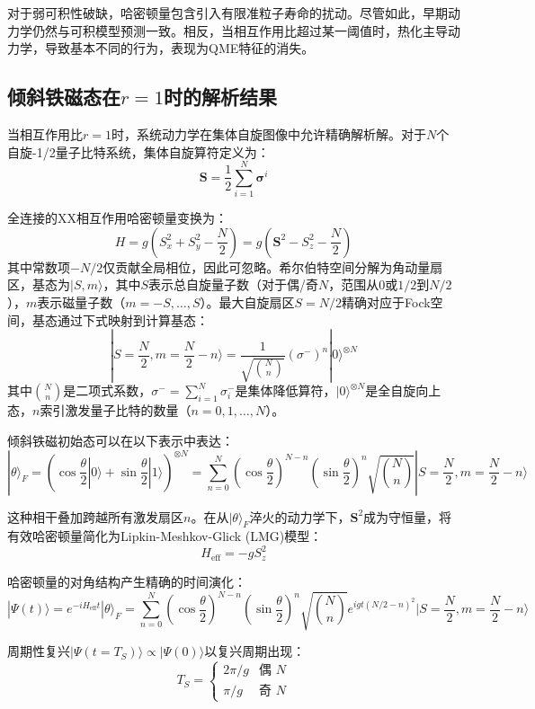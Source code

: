 \documentclass[11pt,a4paper]{article}
\begin{document}
对于弱可积性破缺，哈密顿量包含引入有限准粒子寿命的扰动。尽管如此，早期动力学仍然与可积模型预测一致。相反，当相互作用比超过某一阈值时，热化主导动力学，导致基本不同的行为，表现为QME特征的消失。

\subsection{倾斜铁磁态在$r=1$时的解析结果}

当相互作用比$r=1$时，系统动力学在集体自旋图像中允许精确解析解。对于$N$个自旋-1/2量子比特系统，集体自旋算符定义为：
\[
\bm{S} = \frac{1}{2} \sum_{i=1}^{N} \bm{\sigma}^i
\]

全连接的XX相互作用哈密顿量变换为：
\[
H = g\left(S_x^2 + S_y^2 - \frac{N}{2}\right) = g\left(\bm{S}^2 - S_z^2 - \frac{N}{2}\right)
\]
其中常数项$-N/2$仅贡献全局相位，因此可忽略。希尔伯特空间分解为角动量扇区，基态为$|S,m\rangle$，其中$S$表示总自旋量子数（对于偶/奇$N$，范围从$0$或$1/2$到$N/2$），$m$表示磁量子数（$m=-S,\ldots,S$）。最大自旋扇区$S=N/2$精确对应于Fock空间，基态通过下式映射到计算基态：
\[
|S=\frac{N}{2}, m=\frac{N}{2}-n\rangle = \frac{1}{\sqrt{\binom{N}{n}}}(\sigma^{-})^n |0\rangle^{\otimes N}
\]
其中$\binom{N}{n}$是二项式系数，$\sigma^{-}=\sum_{i=1}^{N}\sigma_i^{-}$是集体降低算符，$|0\rangle^{\otimes N}$是全自旋向上态，$n$索引激发量子比特的数量（$n=0,1,\ldots,N$）。

倾斜铁磁初始态可以在以下表示中表达：
\[
|\theta\rangle_F = \left(\cos\frac{\theta}{2}|0\rangle + \sin\frac{\theta}{2}|1\rangle\right)^{\otimes N}
= \sum_{n=0}^{N} \left(\cos\frac{\theta}{2}\right)^{N-n} \left(\sin\frac{\theta}{2}\right)^n \sqrt{\binom{N}{n}} |S=\frac{N}{2}, m=\frac{N}{2}-n\rangle
\]

这种相干叠加跨越所有激发扇区$n$。在从$|\theta\rangle_F$淬火的动力学下，$\bm{S}^2$成为守恒量，将有效哈密顿量简化为Lipkin-Meshkov-Glick (LMG)模型：
\[
H_{\text{eff}} = -gS_z^2
\]

哈密顿量的对角结构产生精确的时间演化：
\[
|\Psi(t)\rangle = e^{-iH_{\text{eff}}t}|\theta\rangle_F = \sum_{n=0}^{N} \left(\cos\frac{\theta}{2}\right)^{N-n} \left(\sin\frac{\theta}{2}\right)^n \sqrt{\binom{N}{n}} e^{igt(N/2-n)^2} |S=\frac{N}{2}, m=\frac{N}{2}-n\rangle
\]

周期性复兴$|\Psi(t=T_S)\rangle \propto |\Psi(0)\rangle$以复兴周期出现：
\[
T_S = \begin{cases}
2\pi/g & \text{偶 } N \\
\pi/g & \text{奇 } N
\end{cases}
\]
\end{document}
